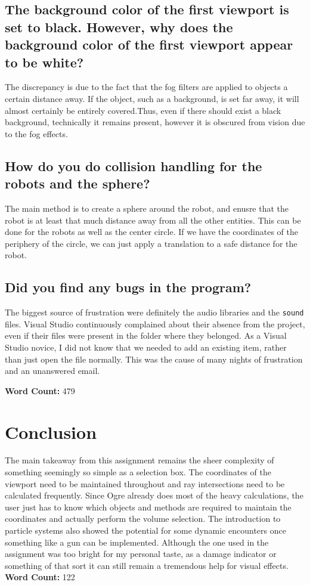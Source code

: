 \documentclass{article}
\begin{document}
\subsection{The background color of the first viewport is set to black. However, why does the background color of the 
first viewport appear to be white?}
The discrepancy is due to the fact that the fog filters are applied to objects a certain distance away. If the object, 
such as a background, is set far away, it will almost certainly be entirely covered.Thus, even if there should exist
a black background, technically it remains present, however it is obscured from vision due to the fog effects.

\subsection{How do you do collision handling for the robots and the sphere?}
The main method is to create a sphere around the robot, and enusre that the robot is at least that much distance away
from all the other entities. This can be done for the robots as well as the center circle. If we have the coordinates
of the periphery of the circle, we can just apply a translation to a safe distance for the robot.

\subsection{Did you find any bugs in the program?}
The biggest source of frustration were definitely the audio libraries and the \texttt{sound} files. Visual Studio 
continuously complained about their absence from the project, even if their files were present in the folder where they
belonged. As a Visual Studio novice, I did not know that we needed to add an existing item, rather than just open the 
file normally. This was the cause of many nights of frustration and an unanswered email.

\textbf{Word Count: } 479
\section{Conclusion}

The main takeaway from this assignment remains the sheer complexity of something seemingly so simple as a selection box.
The coordinates of the viewport need to be maintained throughout and ray intersections need to be calculated frequently.
Since Ogre already does most of the heavy calculations, the user just has to know which objects and methods are required
to maintain the coordinates and actually perform the volume selection. The introduction to particle systems also showed the
potential for some dynamic encounters once something like a gun can be implemented. Although the one used in the assignment
was too bright for my personal taste, as a damage indicator or something of that sort it can still remain a tremendous 
help for visual effects.
\textbf{Word Count: }122
\end{document}
